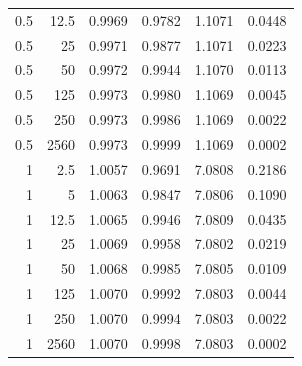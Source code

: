 \begin{tabular}{rrcccc}
0.5 & 12.5 & 0.9969 & 0.9782 & 1.1071 & 0.0448\\
0.5 & 25 & 0.9971 & 0.9877 & 1.1071 & 0.0223\\
0.5 & 50 & 0.9972 & 0.9944 & 1.1070 & 0.0113\\
0.5 & 125 & 0.9973 & 0.9980 & 1.1069 & 0.0045\\
0.5 & 250 & 0.9973 & 0.9986 & 1.1069 & 0.0022\\
0.5 & 2560 & 0.9973 & 0.9999 & 1.1069 & 0.0002\\
\midrule
1 & 2.5 & 1.0057 & 0.9691 & 7.0808 & 0.2186\\
1 & 5 & 1.0063 & 0.9847 & 7.0806 & 0.1090\\
1 & 12.5 & 1.0065 & 0.9946 & 7.0809 & 0.0435\\
1 & 25 & 1.0069 & 0.9958 & 7.0802 & 0.0219\\
1 & 50 & 1.0068 & 0.9985 & 7.0805 & 0.0109\\
1 & 125 & 1.0070 & 0.9992 & 7.0803 & 0.0044\\
1 & 250 & 1.0070 & 0.9994 & 7.0803 & 0.0022\\
1 & 2560 & 1.0070 & 0.9998 & 7.0803 & 0.0002\\
\bottomrule\end{tabular}
